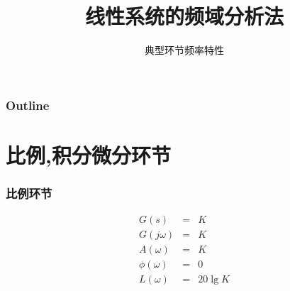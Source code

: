 \documentclass[table]{beamer}
\subtitle{典型环节频率特性}
\title{线性系统的频域分析法}
\author{}
\date{}
\begin{document}
\maketitle

\begin{frame}
\frametitle{Outline}
\setcounter{tocdepth}{3}
\tableofcontents
\end{frame}













\section{比例,积分微分环节}
\label{sec-1}
\begin{frame}
\frametitle{比例环节}
\label{sec-1-1}

\begin{eqnarray*}
G(s) & = & K\\
G(j\omega) & =& K\\
A(\omega) &=& K\\
\phi(\omega) &=& 0 \\
L(\omega)&=& 20\lg K
\end{eqnarray*}
\end{frame}
\end{document}
